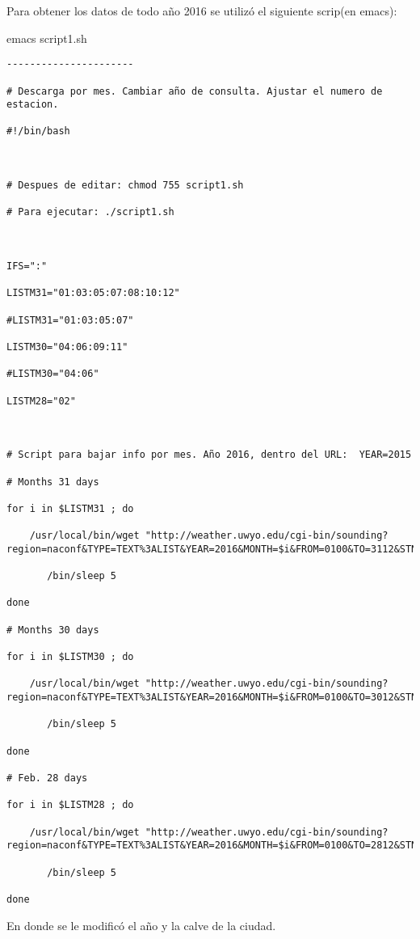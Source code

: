 \documentclass[12pt]{article}
\begin{document}
Para obtener los datos de todo año 2016 se utilizó el siguiente scrip(en emacs):

emacs script1.sh

\begin{verbatim}
----------------------

# Descarga por mes. Cambiar año de consulta. Ajustar el numero de estacion.

#!/bin/bash

 

# Despues de editar: chmod 755 script1.sh

# Para ejecutar: ./script1.sh

 

IFS=":"

LISTM31="01:03:05:07:08:10:12"

#LISTM31="01:03:05:07"

LISTM30="04:06:09:11"

#LISTM30="04:06"

LISTM28="02"

 

# Script para bajar info por mes. Año 2016, dentro del URL:  YEAR=2015

# Months 31 days

for i in $LISTM31 ; do

    /usr/local/bin/wget "http://weather.uwyo.edu/cgi-bin/sounding?region=naconf&TYPE=TEXT%3ALIST&YEAR=2016&MONTH=$i&FROM=0100&TO=3112&STNM=76692"

       /bin/sleep 5

done

# Months 30 days

for i in $LISTM30 ; do

    /usr/local/bin/wget "http://weather.uwyo.edu/cgi-bin/sounding?region=naconf&TYPE=TEXT%3ALIST&YEAR=2016&MONTH=$i&FROM=0100&TO=3012&STNM=76692"

       /bin/sleep 5

done

# Feb. 28 days

for i in $LISTM28 ; do

    /usr/local/bin/wget "http://weather.uwyo.edu/cgi-bin/sounding?region=naconf&TYPE=TEXT%3ALIST&YEAR=2016&MONTH=$i&FROM=0100&TO=2812&STNM=76692"

       /bin/sleep 5

done
\end{verbatim}
\vspace{0.5 cm}
En donde se le modificó el año y la calve de la ciudad.
\end{document}
